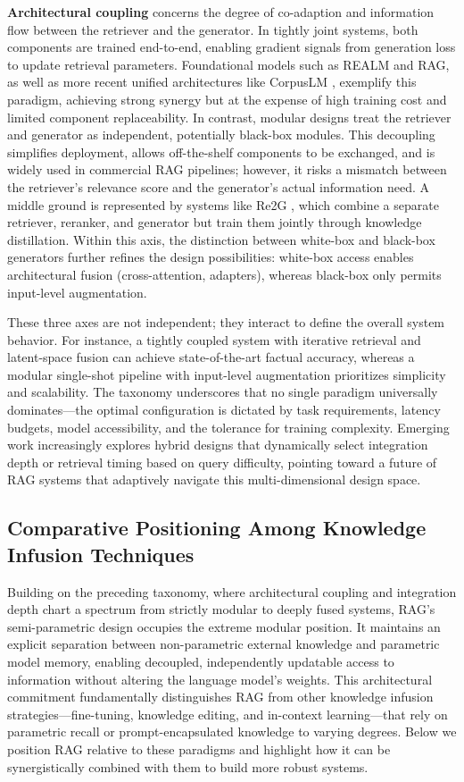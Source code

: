 \documentclass[11pt,a4paper]{article}
\begin{document}
\textbf{Architectural coupling} concerns the degree of co-adaption and information flow between the retriever and the generator. In tightly joint systems, both components are trained end-to-end, enabling gradient signals from generation loss to update retrieval parameters. Foundational models such as REALM and RAG, as well as more recent unified architectures like CorpusLM \cite{arxiv:2402.01176v2}, exemplify this paradigm, achieving strong synergy but at the expense of high training cost and limited component replaceability. In contrast, modular designs treat the retriever and generator as independent, potentially black-box modules. This decoupling simplifies deployment, allows off-the-shelf components to be exchanged, and is widely used in commercial RAG pipelines; however, it risks a mismatch between the retriever's relevance score and the generator's actual information need. A middle ground is represented by systems like Re2G \cite{arxiv:2207.06300v1}, which combine a separate retriever, reranker, and generator but train them jointly through knowledge distillation. Within this axis, the distinction between white-box and black-box generators further refines the design possibilities: white-box access enables architectural fusion (cross-attention, adapters), whereas black-box only permits input-level augmentation.

These three axes are not independent; they interact to define the overall system behavior. For instance, a tightly coupled system with iterative retrieval and latent-space fusion can achieve state-of-the-art factual accuracy, whereas a modular single-shot pipeline with input-level augmentation prioritizes simplicity and scalability. The taxonomy underscores that no single paradigm universally dominates---the optimal configuration is dictated by task requirements, latency budgets, model accessibility, and the tolerance for training complexity. Emerging work increasingly explores hybrid designs that dynamically select integration depth or retrieval timing based on query difficulty, pointing toward a future of RAG systems that adaptively navigate this multi-dimensional design space.


\subsection{Comparative Positioning Among Knowledge Infusion Techniques}


Building on the preceding taxonomy, where architectural coupling and integration depth chart a spectrum from strictly modular to deeply fused systems, RAG's semi-parametric design occupies the extreme modular position. It maintains an explicit separation between non-parametric external knowledge and parametric model memory, enabling decoupled, independently updatable access to information without altering the language model's weights. This architectural commitment fundamentally distinguishes RAG from other knowledge infusion strategies---fine-tuning, knowledge editing, and in-context learning---that rely on parametric recall or prompt-encapsulated knowledge to varying degrees. Below we position RAG relative to these paradigms and highlight how it can be synergistically combined with them to build more robust systems.
\end{document}
